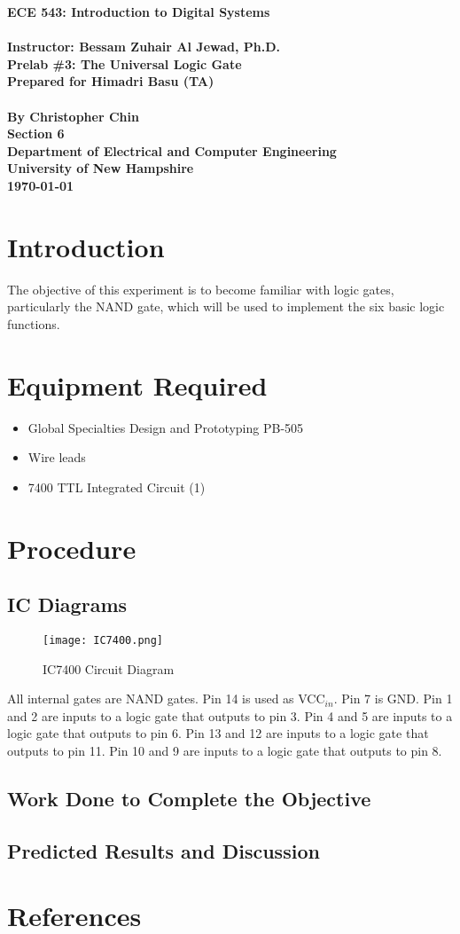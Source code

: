 \documentclass[11pt,a4paper]{article}
\begin{document}
\begin{center}
\textbf{
    \Large{ECE 543: Introduction to Digital Systems}
    \\~\\
    \large{Instructor: Bessam Zuhair Al Jewad, Ph.D.}
    \\[1.25in]
    \LARGE{Prelab \#3: The Universal Logic Gate}
    \\[0.62in]
    \large{Prepared for Himadri Basu (TA)\\~\\By Christopher Chin}
    \\[1.25in]
    \LARGE{Section 6}
    \\[1.25in]
    \Large{Department of Electrical and Computer Engineering\\
           University of New Hampshire}
    \\[1.25in]
    \Large{\today}
}
\end{center}
\clearpage
{}

\tableofcontents
\pagebreak

\section{Introduction}
The objective of this experiment is to become familiar with logic gates, particularly
the NAND gate, which will be used to implement the six basic logic functions.

\section{Equipment Required}
\begin{itemize}
    \item Global Specialties Design and Prototyping PB-505
    \item Wire leads
    \item 7400 TTL Integrated Circuit (1)
\end{itemize}

\section{Procedure}
\subsection{IC Diagrams}
\begin{figure}[h]
    \texttt{[image: IC7400.png]}
    \caption{IC7400 Circuit Diagram}
\end{figure}
All internal gates are NAND gates.
Pin 14 is used as VCC$_{in}$. Pin 7 is GND.
Pin 1 and 2 are inputs to a logic gate that outputs to pin 3.
Pin 4 and 5 are inputs to a logic gate that outputs to pin 6.
Pin 13 and 12 are inputs to a logic gate that outputs to pin 11.
Pin 10 and 9 are inputs to a logic gate that outputs to pin 8.

\subsection{Work Done to Complete the Objective}
\subsection{Predicted Results and Discussion}
\section{References}
\end{document}
